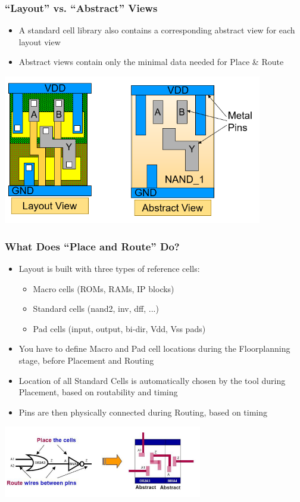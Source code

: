 \documentclass[compress]{beamer}
\begin{document}
\begin{frame}
	\frametitle{“Layout” vs. “Abstract” Views}
		\begin{itemize}
			\item A standard cell library also contains a corresponding	abstract view for each layout view
			\item Abstract views contain only the minimal data needed
			for Place \& Route
		\end{itemize}
		\begin{center}
			\includegraphics[width=0.85\textwidth]{Frame}
		\end{center}
\end{frame}
\begin{frame}
	\frametitle{What Does “Place and Route” Do?}
		\begin{itemize}
			\item Layout is built with three types of reference cells:
				\begin{itemize}
					\item Macro cells (ROMs, RAMs, IP blocks)
					\item Standard cells (nand2, inv, dff, ...)
					\item Pad cells (input, output, bi-dir, Vdd, Vss pads)
				\end{itemize}
			\item You have to define Macro and Pad cell locations during the
			Floorplanning stage, before Placement and Routing
			\item  Location of all Standard Cells is automatically chosen by the tool
			during Placement, based on routability and timing
			\item  Pins are then physically connected during Routing, based on
			timing
		\end{itemize}
		\begin{center}
			\includegraphics[width=0.65\textwidth]{PnR}
		\end{center}
\end{frame}
\end{document}
